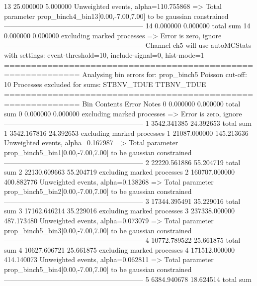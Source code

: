 13         25.000000       5.000000        Unweighted events, alpha=110.755868
  => Total parameter prop_binch4_bin13[0.00,-7.00,7.00] to be gaussian constrained
------------------------------------------------------------
14         0.000000        0.000000        total sum                     
14         0.000000        0.000000        excluding marked processes    
  => Error is zero, ignore      
------------------------------------------------------------
Channel ch5 will use autoMCStats with settings: event-threshold=10, include-signal=0, hist-mode=1
============================================================
Analysing bin errors for: prop_binch5
Poisson cut-off: 10
Processes excluded for sums: STBNV_TDUE TTBNV_TDUE
============================================================
Bin        Contents        Error           Notes                         
0          0.000000        0.000000        total sum                     
0          0.000000        0.000000        excluding marked processes    
  => Error is zero, ignore      
------------------------------------------------------------
1          3542.341385     24.392653       total sum                     
1          3542.167816     24.392653       excluding marked processes    
1          21087.000000    145.213636      Unweighted events, alpha=0.167987
  => Total parameter prop_binch5_bin1[0.00,-7.00,7.00] to be gaussian constrained
------------------------------------------------------------
2          22220.561886    55.204719       total sum                     
2          22130.609663    55.204719       excluding marked processes    
2          160707.000000   400.882776      Unweighted events, alpha=0.138268
  => Total parameter prop_binch5_bin2[0.00,-7.00,7.00] to be gaussian constrained
------------------------------------------------------------
3          17344.395491    35.229016       total sum                     
3          17162.646214    35.229016       excluding marked processes    
3          237338.000000   487.173480      Unweighted events, alpha=0.073079
  => Total parameter prop_binch5_bin3[0.00,-7.00,7.00] to be gaussian constrained
------------------------------------------------------------
4          10772.789522    25.661875       total sum                     
4          10627.606721    25.661875       excluding marked processes    
4          171512.000000   414.140073      Unweighted events, alpha=0.062811
  => Total parameter prop_binch5_bin4[0.00,-7.00,7.00] to be gaussian constrained
------------------------------------------------------------
5          6384.940678     18.624514       total sum                     
